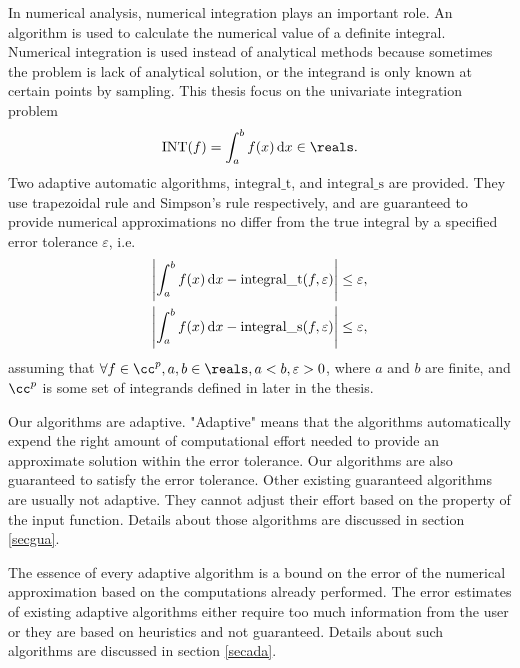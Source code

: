\documentclass{iitthesis}
\theoremstyle{definition}
\theoremstyle{remark}
\begin{document}
In numerical analysis, numerical integration plays an important role. An algorithm is used to calculate the numerical value of a definite integral. Numerical integration is used instead of analytical methods because sometimes the problem is lack of analytical solution, or the integrand is only known at certain points by sampling. This thesis focus on the univariate integration problem
\begin{equation}\label{integral}
    \text{INT}(f)=\int_{a}^{b}f(x)\,\textup{d}x\in\reals.
\end{equation}
Two adaptive automatic algorithms, $\text{integral}\_\text{t}$, and $\text{integral}\_\text{s}$ are provided. They use trapezoidal rule and Simpson's rule respectively, and are guaranteed to provide numerical approximations no differ from the true integral by a specified error tolerance $\varepsilon$, i.e.
\begin{align}\label{approx}
      \left|\int_{a}^{b}f(x)\,\textup{d}x-\text{integral}\_\text{t}(f,\varepsilon)\right|\leq \varepsilon,& \\
      \left|\int_{a}^{b}f(x)\,\textup{d}x-\text{integral}\_\text{s}(f,\varepsilon)\right|\leq \varepsilon,&
\end{align}
assuming that $\forall f \in \cc^{p}, a,b\in\reals, a<b, \varepsilon>0$, where $a$ and $b$ are finite, and $\cc^{p}$ is some set of integrands defined in later in the thesis.

Our algorithms are adaptive. "Adaptive" means that the algorithms automatically expend the right amount of computational effort needed to provide an approximate solution within the error tolerance. Our algorithms are also guaranteed to satisfy the error tolerance. Other existing guaranteed algorithms are usually not adaptive. They cannot adjust their effort based on the property of the input function. Details about those algorithms are discussed in section \ref{secgua}.

The essence of every adaptive algorithm is a bound on the error of the numerical approximation based on the computations already performed. The error estimates of existing adaptive algorithms either require too much information from the user or they are based on heuristics and not guaranteed. Details about such algorithms are discussed in section \ref{secada}.
\end{document}
